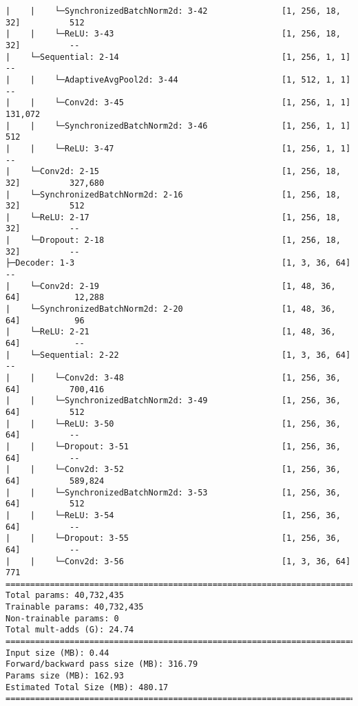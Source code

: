 \begin{verbatim}
|    |    └─SynchronizedBatchNorm2d: 3-42               [1, 256, 18, 32]          512
|    |    └─ReLU: 3-43                                  [1, 256, 18, 32]          --
|    └─Sequential: 2-14                                 [1, 256, 1, 1]            --
|    |    └─AdaptiveAvgPool2d: 3-44                     [1, 512, 1, 1]            --
|    |    └─Conv2d: 3-45                                [1, 256, 1, 1]            131,072
|    |    └─SynchronizedBatchNorm2d: 3-46               [1, 256, 1, 1]            512
|    |    └─ReLU: 3-47                                  [1, 256, 1, 1]            --
|    └─Conv2d: 2-15                                     [1, 256, 18, 32]          327,680
|    └─SynchronizedBatchNorm2d: 2-16                    [1, 256, 18, 32]          512
|    └─ReLU: 2-17                                       [1, 256, 18, 32]          --
|    └─Dropout: 2-18                                    [1, 256, 18, 32]          --
├─Decoder: 1-3                                          [1, 3, 36, 64]            --
|    └─Conv2d: 2-19                                     [1, 48, 36, 64]           12,288
|    └─SynchronizedBatchNorm2d: 2-20                    [1, 48, 36, 64]           96
|    └─ReLU: 2-21                                       [1, 48, 36, 64]           --
|    └─Sequential: 2-22                                 [1, 3, 36, 64]            --
|    |    └─Conv2d: 3-48                                [1, 256, 36, 64]          700,416
|    |    └─SynchronizedBatchNorm2d: 3-49               [1, 256, 36, 64]          512
|    |    └─ReLU: 3-50                                  [1, 256, 36, 64]          --
|    |    └─Dropout: 3-51                               [1, 256, 36, 64]          --
|    |    └─Conv2d: 3-52                                [1, 256, 36, 64]          589,824
|    |    └─SynchronizedBatchNorm2d: 3-53               [1, 256, 36, 64]          512
|    |    └─ReLU: 3-54                                  [1, 256, 36, 64]          --
|    |    └─Dropout: 3-55                               [1, 256, 36, 64]          --
|    |    └─Conv2d: 3-56                                [1, 3, 36, 64]            771
=========================================================================================================
Total params: 40,732,435
Trainable params: 40,732,435
Non-trainable params: 0
Total mult-adds (G): 24.74
=========================================================================================================
Input size (MB): 0.44
Forward/backward pass size (MB): 316.79
Params size (MB): 162.93
Estimated Total Size (MB): 480.17
=========================================================================================================

\end{verbatim}








